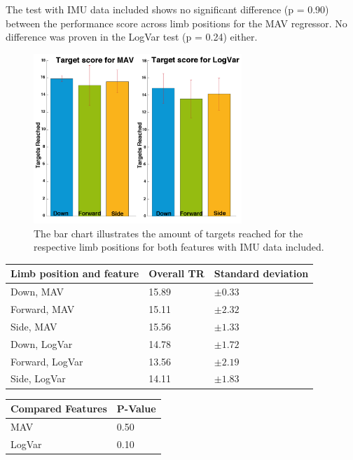 The test with IMU data included shows no significant difference (p = 0.90) between the performance score across limb positions for the MAV regressor. No difference was proven in the LogVar test (p = 0.24) either.

\begin{figure}[H]
	\includegraphics[width=0.7\textwidth]{figures/results/TargetsReachedIMU}  %
	\caption{The bar chart illustrates the amount of targets reached for the respective limb positions for both features with IMU data included.}
	\label{fig:TargetsReachedIMU}  %
\end{figure}

	\begin{center}
		\begin{tabular}{l l l}
			\toprule
			\textbf{Limb position and feature} & \textbf{Overall TR} & \textbf{Standard deviation}\\
			\midrule
			Down, MAV & 15.89 & $\pm 0.33$ \\
			Forward, MAV & 15.11 & $\pm 2.32$ \\
			Side, MAV & 15.56 & $\pm 1.33$ \\
			Down, LogVar & 14.78 & $\pm 1.72$ \\
			Forward, LogVar & 13.56 & $\pm 2.19$ \\
			Side, LogVar & 14.11 & $\pm 1.83$ \\
			\bottomrule
		\end{tabular}
	\end{center}
	
	\begin{center}
		\begin{tabular}{l l}
			\toprule
			\textbf{Compared Features} & \textbf{P-Value}\\
			\midrule
			MAV & 0.50 \\
			LogVar & 0.10 \\
			\bottomrule
		\end{tabular}
	\end{center}
	
